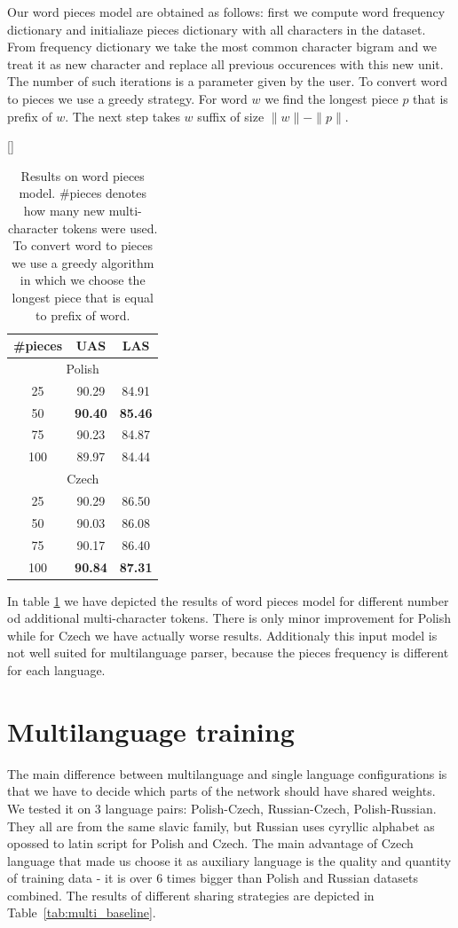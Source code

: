Our word pieces model are obtained as follows:
first we compute word frequency dictionary  and initialiaze pieces dictionary with all characters in the dataset.
From frequency dictionary we take the most common character bigram and we treat it as new character and replace all previous occurences
with this new unit. The number of such iterations is a parameter given by the user.
To convert word to pieces we use a greedy strategy. For word $w$ we find the longest
piece $p$ that is prefix of $w$. The next step takes $w$ suffix of size $\|w\| - \|p\|$.

\begin{table}[!htbp]
    [\FBwidth]
    {\caption{Results on word pieces model. \#pieces denotes how many new
    multi-character tokens were used. To convert word to pieces we
    use a greedy algorithm in which we choose the longest piece that is equal
    to prefix of word.}
    \label{tab:word_pieces}}
{
    \begin{tabular}{c c c}
        \#pieces & UAS & LAS \\ \hline
        \multicolumn{3}{c}{Polish}\\
        25 & 90.29 &  84.91 \\
        50 & \textbf{90.40} &  \textbf{85.46}\\
        75 &  90.23 & 84.87\\
        100 & 89.97 & 84.44\\\hline
        \multicolumn{3}{c}{Czech}\\
        25 & 90.29 & 86.50\\
        50 & 90.03 & 86.08\\
        75 & 90.17 & 86.40\\
        100 & \textbf{90.84} & \textbf{87.31}
    \end{tabular}
}
\end{table}

In table \ref{tab:word_pieces} we have depicted the results of word pieces model
for different number od additional multi-character tokens. There is only minor
improvement for Polish while for Czech we have actually worse results. Additionaly
this input model is not well suited for multilanguage parser, because the pieces
frequency is different for each language.

\section{Multilanguage training}
The main difference between multilanguage and single language configurations is
that we have to decide which parts of the network should have shared weights.
We tested it on 3 language pairs: Polish-Czech, Russian-Czech, Polish-Russian.
They all are from the same slavic family, but Russian uses cyryllic alphabet as
opossed to latin script for Polish and Czech. The main advantage of Czech language
that made us choose it as auxiliary language is the quality and quantity of training data
- it is over 6 times bigger than Polish and Russian datasets combined.
The results of different sharing strategies are depicted in Table~\ref{tab:multi_baseline}.

